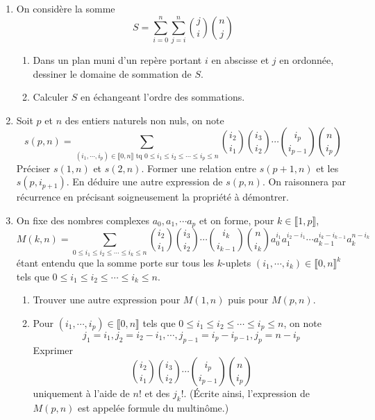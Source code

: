 \begin{enumerate}
  \item On considère la somme 
\begin{displaymath}
  S = \sum_{i=0}^{n}\sum_{j=i}^{n} \binom{j}{i}\binom{n}{j}
\end{displaymath}
\begin{enumerate}
  \item Dans un plan muni d'un repère portant $i$ en abscisse et $j$ en ordonnée, dessiner le domaine de sommation de $S$.
  \item Calculer $S$ en échangeant l'ordre des sommations.
\end{enumerate}

  \item Soit $p$ et $n$ des entiers naturels non nuls, on note
\begin{displaymath}
  s(p,n) = 
\sum_{(i_1,\cdots,i_p)\in \llbracket 0, n \rrbracket \text{ tq } 0\leq i_1 \leq i_2 \leq \cdots \leq i_p \leq n}
\binom{i_2}{i_1}\binom{i_3}{i_2}\cdots \binom{i_p}{i_{p-1}}\binom{n}{i_p}
\end{displaymath}
Préciser $s(1,n)$ et $s(2,n)$. Former une relation entre $s(p+1,n)$ et les $s(p,i_{p+1})$. En déduire une autre expression de $s(p,n)$. On raisonnera par récurrence en précisant soigneusement la propriété à démontrer.

  \item On fixe des nombres complexes $a_0, a_1,\cdots a_p$ et on forme, pour $k\in \llbracket 1,p \rrbracket$, 
\begin{displaymath}
  M(k,n)= 
\sum_{ 0\leq i_1 \leq i_2 \leq \cdots \leq i_k \leq n}
\binom{i_2}{i_1}\binom{i_3}{i_2}\cdots \binom{i_k}{i_{k-1}}\binom{n}{i_k}
a_0^{i_1}a_1^{i_2-i_1}\cdots a_{k-1}^{i_k - i_{k-1}}a_k^{n-i_k}
\end{displaymath}
étant entendu que la somme porte sur tous les $k$-uplets $(i_1,\cdots,i_k)\in \llbracket 0, n \rrbracket^k$  tels que $0\leq i_1 \leq i_2 \leq \cdots \leq i_k \leq n$.\begin{enumerate}
  \item Trouver une autre expression pour $M(1,n)$ puis pour $M(p,n)$.
  \item Pour $(i_1,\cdots,i_p)\in \llbracket 0, n \rrbracket$  tels que $0\leq i_1 \leq i_2 \leq \cdots \leq i_p \leq n$, on note 
\begin{displaymath}
  j_1 = i_1, j_2 = i_2 -i_1, \cdots, j_{p-1} = i_{p} - i_{p-1}, j_p = n -i_{p}
\end{displaymath}
Exprimer
\begin{displaymath}
  \binom{i_2}{i_1}\binom{i_3}{i_2}\cdots \binom{i_p}{i_{p-1}}\binom{n}{i_p}
\end{displaymath}
uniquement à l'aide de $n!$ et des $j_k!$.\newline
(\'Ecrite ainsi, l'expression de $M(p,n)$ est appelée formule du multinôme.)
\end{enumerate}


\end{enumerate}

